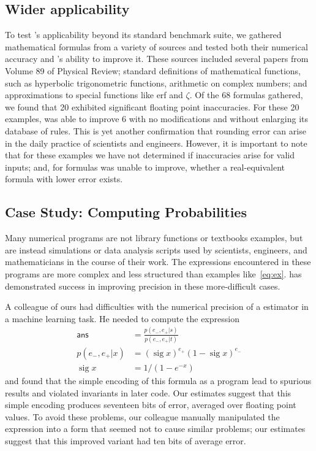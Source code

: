\documentclass[paper.tex]{subfiles}
\begin{document}
\subsection{Wider applicability}

To test \casio's applicability beyond its standard benchmark suite, we
gathered mathematical formulas from a variety of sources and tested
both their numerical accuracy and \casio's ability to improve it.
These sources included several papers from Volume 89 of Physical
Review; standard definitions of mathematical functions, such as
hyperbolic trigonometric functions, arithmetic on complex numbers; and
approximations to special functions like \textsf{erf} and $\zeta$.  Of the
68 formulas gathered, we found that 20 exhibited significant floating
point inaccuracies.  For these 20 examples, \casio was able to improve
6 with no modifications and without enlarging its database of rules.
This is yet another confirmation that rounding error can arise in the
daily practice of scientists and engineers.  However, it is important
to note that for these examples we have not determined if inaccuracies
arise for valid inputs; and, for formulas \casio was unable to
improve, whether a real-equivalent formula with lower error exists.

\subsection{Case Study: Computing Probabilities}

Many numerical programs are not library functions or textbooks
examples, but are instead simulations or data analysis scripts used by
scientists, engineers, and mathematicians in the course of their work.
The expressions encountered in these programs are more complex and
less structured than examples like~\eqref{eq:ex}.  \casio has
demonstrated success in improving precision in these more-difficult
cases.

A colleague of ours had difficulties with the numerical precision of a
estimator in a machine learning task.  He needed to compute the
expression
\begin{align*}
\mathsf{ans} &= \frac{p(e_-,e_+|s)}{p(e_-,e_+|t)} \\
p(e_-, e_+|x) &= (\operatorname{sig} x)^{e_+} (1 - \operatorname{sig} x)^{e_-} \\
\operatorname{sig}x &= 1 / (1 - e^{-x})
\end{align*}
and found that the simple encoding of this formula as a program lead
to spurious results and violated invariants in later code.  Our
estimates suggest that this simple encoding produces seventeen bits of
error, averaged over floating point values.  To avoid these problems,
our colleague manually manipulated the expression into a form that
seemed not to cause similar problems; our estimates suggest that this
improved variant had ten bits of average error.
\end{document}
